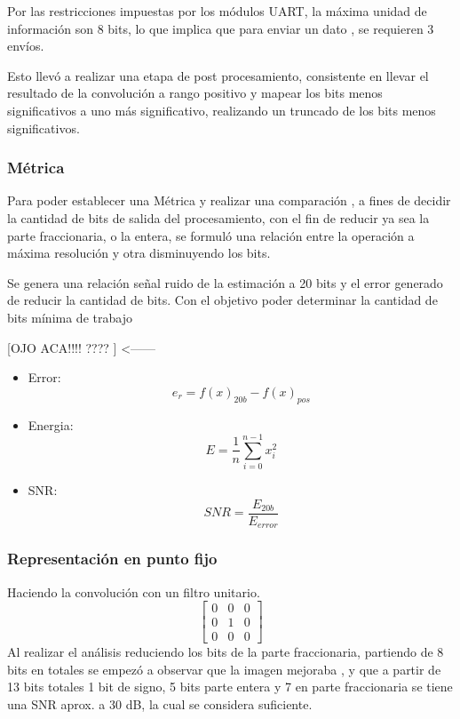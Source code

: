 \documentclass[conference,compsoc]{IEEEtran}
\begin{document}
Por las restricciones impuestas por los m\'odulos UART, la m\'axima unidad de
informaci\'on son 8 bits, lo que implica que para enviar un dato , se requieren 3 env\'ios.

Esto llev\'o a realizar una etapa de post procesamiento, consistente en llevar el
resultado de la convoluci\'on  a rango positivo y mapear los bits menos
significativos a  uno m\'as significativo, realizando un truncado de los
bits menos significativos.

\subsubsection{M\'etrica}
Para poder establecer una M\'etrica y realizar una comparaci\'on , a fines de decidir la
cantidad de bits de salida del procesamiento, con el fin de reducir ya sea la parte fraccionaria,
o la entera, se formul\'o una relaci\'on entre la operaci\'on a m\'axima resoluci\'on y otra
disminuyendo los bits.

Se genera una relación señal ruido de la estimación a 20 bits y el error
generado de reducir la cantidad de bits. Con el objetivo poder determinar la
cantidad de bits mínima de trabajo

[OJO ACA!!!! ???? ]   <------
\begin{itemize}
\item Error: $$e_r=f(x)_{20b}-f(x)_{pos}$$

\item Energia: $$E=\frac{1}{n}\sum_{i=0}^{n-1}x^2_i$$

\item SNR: $$SNR=\frac{E_{20b}}{E_{error}}$$

\end{itemize}

\subsubsection{Representaci\'on en punto fijo}
Haciendo la convolución con un filtro unitario.
$$
\begin{bmatrix}
0 & 0 & 0\\ 
0 & 1 & 0\\ 
0 & 0 & 0
\end{bmatrix}
$$
Al realizar el análisis reduciendo los bits de la parte fraccionaria, partiendo
de 8 bits en totales se empezó a observar que la imagen mejoraba , y que a
partir de 13 bits totales 1 bit de signo, 5 bits parte entera y 7 en parte
fraccionaria  se tiene una SNR aprox. a 30 dB, la cual se considera suficiente.
\end{document}
